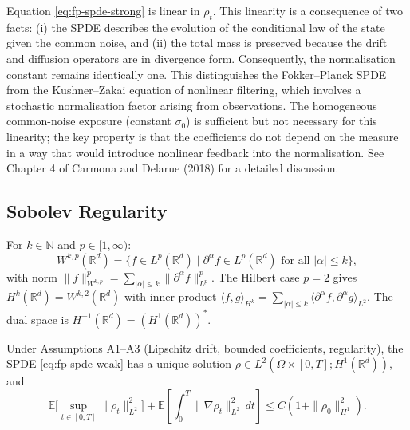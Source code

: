\begin{remark}
Equation \eqref{eq:fp-spde-strong} is linear in $\rho_t$. This linearity is a
consequence of two facts: (i) the SPDE describes the evolution of the conditional law
of the state given the common noise, and (ii) the total mass is preserved because the
drift and diffusion operators are in divergence form. Consequently, the normalisation
constant remains identically one. This distinguishes the Fokker--Planck SPDE from the
Kushner--Zakai equation of nonlinear filtering, which involves a stochastic
normalisation factor arising from observations. The homogeneous common-noise exposure
(constant $\sigma_0$) is sufficient but not necessary for this linearity; the key
property is that the coefficients do not depend on the measure in a way that would
introduce nonlinear feedback into the normalisation. See Chapter 4 of Carmona and
Delarue (2018) for a detailed discussion.
\end{remark}

\subsection{Sobolev Regularity}

\begin{definition}
For $k \in \mathbb{N}$ and $p \in [1,\infty)$:
\[
    W^{k,p}(\mathbb{R}^d) = \{ f \in L^p(\mathbb{R}^d) \mid \partial^\alpha f \in
    L^p(\mathbb{R}^d) \text{ for all } |\alpha| \leq k \},
\]
with norm $\|f\|_{W^{k,p}}^p = \sum_{|\alpha| \leq k} \|\partial^\alpha f\|_{L^p}^p$.
The Hilbert case $p=2$ gives $H^k(\mathbb{R}^d) = W^{k,2}(\mathbb{R}^d)$ with inner
product $\langle f,g \rangle_{H^k} = \sum_{|\alpha| \leq k} \langle \partial^\alpha f,
\partial^\alpha g \rangle_{L^2}$. The dual space is
$H^{-1}(\mathbb{R}^d) = (H^1(\mathbb{R}^d))^*$.
\end{definition}

\begin{theorem}
\label{thm:fp-sobolev-wellposedness}
Under Assumptions A1--A3 (Lipschitz drift, bounded coefficients, regularity), the SPDE
\eqref{eq:fp-spde-weak} has a unique solution
$\rho \in L^2(\Omega \times [0,T]; H^1(\mathbb{R}^d))$, and
\begin{equation}
    \mathbb{E}\Big[ \sup_{t \in [0,T]} \|\rho_t\|_{L^2}^2 \Big] + \mathbb{E}\left[
    \int_0^T \|\nabla\rho_t\|_{L^2}^2\, dt \right] \leq C(1 + \|\rho_0\|_{H^1}^2).
    \label{eq:fp-sobolev-bound}
\end{equation}
\end{theorem}


